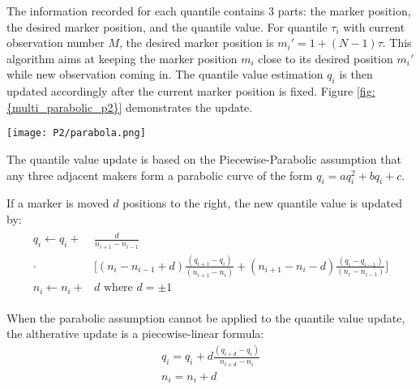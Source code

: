 The information recorded for each quantile contains 3 parts: the marker position, the desired marker position, and the quantile value. For quantile $\tau_i$ with current observation number $M$, the desired marker position is $m_i \prime = 1 + (N-1)\tau$. This algorithm aims at keeping the marker position $m_i$ close to its desired position $m_i \prime$ while new observation coming in. The quantile value estimation $q_i$ is then updated accordingly after the current marker position is fixed. Figure \ref{fig: {multi_parabolic_p2}} demonstrates the update.

\begin{figure*}[h!]
	\texttt{[image: P2/parabola.png]}
    \caption{Quantile value update using the Piecewise-Parabolic($P^2$) formula}
    \label{fig: {multi_parabolic_p2}}
\end{figure*}

The quantile value update is based on the Piecewise-Parabolic assumption that any three adjacent makers form a parabolic curve of the form $q_i = aq_i^2 + bq_i + c$.

If a marker is moved $d$ positions to the right, the new quantile value is updated by:
\begin{align}
\begin{split}
    q_{i} \leftarrow q_{i}+ & \frac{d}{n_{i+1}-n_{i-1}}\\
    \cdot & { \bigg[ 
        \left(n_{i}-n_{i-1}+d\right) \frac{\left(q_{i+1}-q_{i}\right)}{\left(n_{i+1}-n_{i}\right)}
        +\left(n_{i+1}-n_{i}-d\right) \frac{\left(q_{i}-q_{i-1}\right)}{\left(n_{i}-n_{i-1}\right)}
        } \bigg] \\
    n_{i} \leftarrow n_{i}+&d \text{ where } d = \pm 1
\end{split}
\end{align}

When the parabolic assumption cannot be applied to the quantile value update, the altherative update is a piecewise-linear formula:
\begin{equation}
    \begin{array}{l}
    q_{i}=q_{i}+d \frac{\left(q_{i+d}-q_{i}\right)}{n_{i+d}-n_{i}} \\
    n_{i}=n_{i}+d
    \end{array}
\end{equation}

